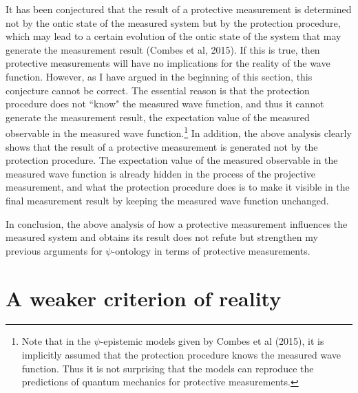It has been conjectured that the result of a protective measurement is determined not by the ontic state of the measured system but by the protection procedure, which may lead to a certain evolution of the ontic state of the system that may generate the measurement result (Combes et al, 2015). If this is true, then protective measurements will have no implications for the reality of the wave function. 
However, as I have argued in the beginning of this section, this conjecture cannot be correct. The essential reason is that the protection procedure does not ``know" the measured wave function, and thus it cannot generate the measurement result, the expectation value of the measured observable in the measured wave function.\footnote{Note that in the $\psi$-epistemic models given by Combes et al (2015), it is implicitly assumed that the protection procedure knows the measured wave function. Thus it is not surprising that the models can reproduce the predictions of quantum mechanics for protective measurements.}  %
In addition, the above analysis clearly shows that the result of a protective measurement is generated not by the protection procedure.  
The expectation value of the measured observable in the measured wave function is already hidden in the process of the projective measurement, and what the protection procedure does is to make it visible in the final measurement result by keeping the measured wave function unchanged.  

In conclusion, the above analysis of how a protective measurement influences the measured system and obtains its result does not refute but strengthen my previous arguments for $\psi$-ontology in terms of protective measurements.

\section{A weaker criterion of reality}

